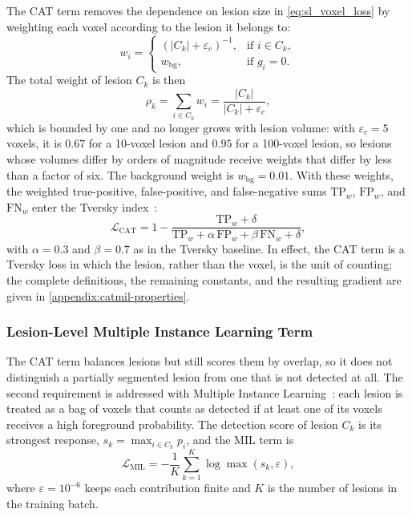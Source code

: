 The CAT term removes the dependence on lesion size in
\cref{eq:sl_voxel_loss} by weighting each voxel according to the lesion it
belongs to:
\begin{equation}
w_i =
\begin{cases}
(|C_k| + \varepsilon_{c})^{-1}, & \text{if } i \in C_k, \\
w_{\mathrm{bg}}, & \text{if } g_i = 0 .
\end{cases}
\label{eq:sl_cat_weights}
\end{equation}
The total weight of lesion $C_k$ is then
\begin{equation}
\rho_k
=
\sum_{i \in C_k} w_i
=
\frac{|C_k|}{|C_k| + \varepsilon_{c}} ,
\label{eq:sl_cat_lesion_weight}
\end{equation}
which is bounded by one and no longer grows with lesion volume: with
$\varepsilon_{c}=5$ voxels, it is $0.67$ for a 10-voxel lesion and $0.95$
for a 100-voxel lesion, so lesions whose volumes differ by orders of
magnitude receive weights that differ by less than a factor of six. The
background weight is $w_{\mathrm{bg}}=0.01$. With these weights, the
weighted true-positive, false-positive, and false-negative sums
$\mathrm{TP}_{w}$, $\mathrm{FP}_{w}$, and $\mathrm{FN}_{w}$ enter the
Tversky index~\cite{salehi_tversky_2017}:
\begin{equation}
\mathcal{L}_{\mathrm{CAT}}
=
1 -
\frac{\mathrm{TP}_{w}+\delta}
{\mathrm{TP}_{w} + \alpha\, \mathrm{FP}_{w} + \beta\, \mathrm{FN}_{w} + \delta},
\label{eq:sl_cat_loss}
\end{equation}
with $\alpha=0.3$ and $\beta=0.7$ as in the Tversky baseline. In effect,
the CAT term is a Tversky loss in which the lesion, rather than the voxel,
is the unit of counting; the complete definitions, the remaining constants,
and the resulting gradient are given in \cref{appendix:catmil-properties}.

\subsubsection{Lesion-Level Multiple Instance Learning Term}

The CAT term balances lesions but still scores them by overlap, so it does
not distinguish a partially segmented lesion from one that is not detected
at all. The second requirement is addressed with Multiple Instance
Learning~\cite{ilse_attention-based_2018}: each lesion is treated as a bag
of voxels that counts as detected if at least one of its voxels receives a
high foreground probability. The detection score of lesion $C_k$ is its
strongest response, $s_k = \max_{i \in C_k} p_i$, and the MIL term is
\begin{equation}
\mathcal{L}_{\mathrm{MIL}}
=
-\frac{1}{K} \sum_{k=1}^{K} \log \max(s_k, \varepsilon) ,
\label{eq:sl_mil_loss}
\end{equation}
where $\varepsilon=10^{-6}$ keeps each contribution finite and $K$ is the
number of lesions in the training batch.

